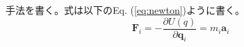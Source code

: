 手法を書く。式は以下のEq. (\ref{eq:newton})ように書く。
\begin{equation}
    {\bm F_{i}}= -\frac{\partial U(q)}{\partial {\bm q_{i}}} = m_{i}{\bm a_{i}}
 \label{eq:newton}
\end{equation}